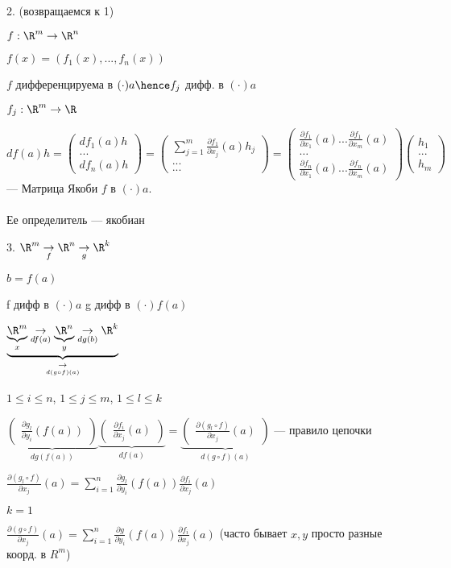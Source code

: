 2. (возвращаемся к 1)

$f : \R ^ m \to \R^n$

$f(x) = (f_1(x), ..., f_n(x))$

$f$ дифференцируема в $(\cdot) a \hence f_j$ дифф. в $(\cdot) a$


$f_j : \R^ m \to \R$

$df(a)h = \begin{pmatrix}
    df_1(a)h\\
    ...\\
    df_n(a)h
\end{pmatrix} = \begin{pmatrix}
    \sum_{j=1}^m \frac{\partial f_1}{\partial x_j}(a) h_j\\
    ...\\
    ... 
\end{pmatrix} = \begin{pmatrix}
    \frac{\partial f_1}{\partial x_1}(a) ... \frac{\partial f_1}{\partial x_m}(a) \\
    \dots \\
    \frac{\partial f_n}{\partial x_1}(a) ... \frac{\partial f_n}{\partial x_m}(a) 
\end{pmatrix} \begin{pmatrix}
    h_1\\
    ...\\
    h_m
\end{pmatrix}$ --- Матрица Якоби $f$ в $(\cdot) a$. \\ \\ Ее определитель --- якобиан


3. $\R^m \underset{f}{\to} \R^n \underset{g}{\to}  \R ^ k$

$b = f(a)$

f дифф в $(\cdot) a$
g дифф в $(\cdot) f(a)$

$\underbrace{\underbrace{\R ^ m}_{x} \underset{df(a)}{\to} \underbrace{\R ^ n}_{y} \underset{dg(b)}{\to} \R ^ k}_{\underset{d(g\circ f)(a)}{\to}}$

$1 \leqslant i \leqslant n$,
$1 \leqslant j \leqslant m$,
$1 \leqslant l \leqslant k$

$\underbrace{\begin{pmatrix}
    \frac{\partial g_l}{\partial y_i}(f(a))
\end{pmatrix}}_{dg(f(a))} \underbrace{\begin{pmatrix}
    \frac{\partial f_i}{\partial x_j}(a)
\end{pmatrix}}_{df(a)} = \underbrace{\begin{pmatrix}
    \frac{\partial (g_l \circ f)}{\partial x_j}(a)
\end{pmatrix}}_{d(g \circ f)(a)}$ --- правило цепочки

$\frac{\partial (g_l \circ f)}{\partial x_j}(a) = \sum_{i = 1}^{n} \frac{\partial g_l}{\partial y_i}(f(a)) \frac{\partial f_i}{\partial x_j}(a)$


$k = 1$

$\frac{\partial (g \circ f)}{\partial x_j}(a) = \sum_{i = 1} ^ n \frac{\partial g}{\partial y_i}(f(a)) \frac{\partial f_i}{\partial x_j}(a)$ (часто бывает $x, y$ просто разные коорд. в $R ^ m$)
